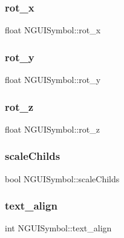 \subsubsection{\texorpdfstring{rot\+\_\+x}{rot\_x}}
{\footnotesize\ttfamily float N\+G\+U\+I\+Symbol\+::rot\+\_\+x}

\hypertarget{class_n_g_u_i_symbol_a3292e1b1c125de5d3bb787f8969a866a}{}\label{class_n_g_u_i_symbol_a3292e1b1c125de5d3bb787f8969a866a} 
\subsubsection{\texorpdfstring{rot\+\_\+y}{rot\_y}}
{\footnotesize\ttfamily float N\+G\+U\+I\+Symbol\+::rot\+\_\+y}

\hypertarget{class_n_g_u_i_symbol_ab1fdfaafb1166dd2c82e0a5c98ee3a6a}{}\label{class_n_g_u_i_symbol_ab1fdfaafb1166dd2c82e0a5c98ee3a6a} 
\subsubsection{\texorpdfstring{rot\+\_\+z}{rot\_z}}
{\footnotesize\ttfamily float N\+G\+U\+I\+Symbol\+::rot\+\_\+z}

\hypertarget{class_n_g_u_i_symbol_a36184100d424cb1fa8e648243fef4795}{}\label{class_n_g_u_i_symbol_a36184100d424cb1fa8e648243fef4795} 
\subsubsection{\texorpdfstring{scale\+Childs}{scaleChilds}}
{\footnotesize\ttfamily bool N\+G\+U\+I\+Symbol\+::scale\+Childs}

\hypertarget{class_n_g_u_i_symbol_a7ae840941f6d996d91c572e52c148add}{}\label{class_n_g_u_i_symbol_a7ae840941f6d996d91c572e52c148add} 
\subsubsection{\texorpdfstring{text\+\_\+align}{text\_align}}
{\footnotesize\ttfamily int N\+G\+U\+I\+Symbol\+::text\+\_\+align}

